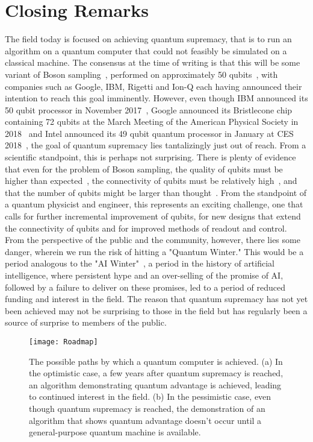 \section{Closing Remarks}
The field today is focused on achieving quantum supremacy, that is to run an algorithm on a quantum computer that could not feasibly be
simulated on a classical machine. The consensus at the time of writing is that this will be some variant of Boson sampling~\cite{Aaronson:2011},
performed on approximately 50 qubits~\cite{savage,8322045,10.1038/s41567-018-0131-y}, with companies such as Google, IBM, Rigetti and Ion-Q each having
announced their intention to reach this goal imminently. However, even though IBM announced its 50 qubit processor in November 2017~\cite{ibmq}, Google announced
its Bristlecone chip containing 72 qubits at the March Meeting of the American Physical Society in 2018~\cite{gcryocmos,Neill195} and Intel announced
its 49 qubit quantum processor in January at CES 2018~\cite{intelq}, the goal of quantum supremacy lies tantalizingly just out of reach. From a scientific standpoint,
this is perhaps not surprising. There is plenty of evidence that even for the problem of Boson sampling, the quality of qubits must be higher
than expected~\cite{PhysRevX.6.021039,PhysRevLett.117.080501}, the connectivity of qubits must be relatively high~\cite{s41567-018-0124-x},
and that the number of qubits might be larger than thought~\cite{2017arXiv171005867P}.
From the standpoint of a quantum physicist and engineer, this represents an exciting challenge, one that calls for further incremental improvement of qubits,
for new designs that extend the connectivity of qubits and for improved methods of readout and control. From the perspective of the public and the community, however,
there lies some danger, wherein we run the risk of hitting a "Quantum Winter." This would be a period analogous to the "AI Winter"~\cite{crevier1993ai},
a period in the history of artificial intelligence, where persistent hype and an over-selling of the promise of AI, followed by a failure to deliver on these promises,
led to a period of reduced funding and interest in the field. The reason that quantum supremacy has not yet been achieved may not be surprising to those in the
field but has regularly been a source of surprise to members of the public.

\begin{figure}
    \texttt{[image: Roadmap]}
    \caption[Roadmap to a quantum computer]{\label{fig:roadmap} The possible paths by which a quantum computer is achieved. (a) In the optimistic case,
    a few years after quantum supremacy is reached, an algorithm demonstrating quantum advantage is achieved, leading to continued interest in the field. (b) In the pessimistic case,
    even though quantum supremacy is reached, the demonstration of an algorithm that shows quantum advantage doesn't occur until a general-purpose quantum machine is available.}
\end{figure}

